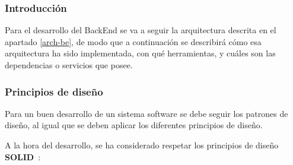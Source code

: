 
    \subsubsection{Introducción}

        Para el desarrollo del BackEnd se va a seguir la arquitectura descrita en el apartado \ref{arch-be}, de modo que a continuación se describirá cómo esa arquitectura ha sido implementada, con qué herramientas, y cuáles son las dependencias o servicios que posee.

    \subsubsection{Principios de diseño}
    
        Para un buen desarrollo de un sistema software se debe seguir los patrones de diseño, al igual que se deben aplicar los diferentes principios de diseño.
        
        A la hora del desarrollo, se ha considerado respetar los principios de diseño \textbf{SOLID}~\cite{clean-arch-book}:
        
